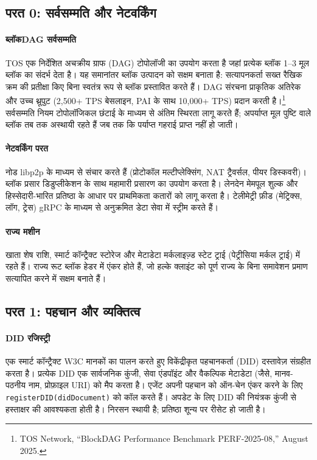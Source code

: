 \documentclass[11pt]{article}
\begin{document}
\subsection{परत 0: सर्वसम्मति और नेटवर्किंग}
\paragraph{ब्लॉकDAG सर्वसम्मति} TOS एक निर्देशित अचक्रीय ग्राफ (DAG) टोपोलॉजी का उपयोग करता है जहां प्रत्येक ब्लॉक 1--3 मूल ब्लॉक का संदर्भ देता है। यह समानांतर ब्लॉक उत्पादन को सक्षम बनाता है: सत्यापनकर्ता सख्त रैखिक क्रम की प्रतीक्षा किए बिना स्वतंत्र रूप से ब्लॉक प्रस्तावित करते हैं। DAG संरचना प्राकृतिक अतिरेक और उच्च थ्रूपुट (2,500+ TPS बेसलाइन, PAI के साथ 10,000+ TPS) प्रदान करती है।\footnote{TOS Network, ``BlockDAG Performance Benchmark PERF-2025-08,'' August 2025.} सर्वसम्मति नियम टोपोलॉजिकल छंटाई के माध्यम से अंतिम स्थिरता लागू करते हैं; अपर्याप्त मूल पुष्टि वाले ब्लॉक तब तक अस्थायी रहते हैं जब तक कि पर्याप्त गहराई प्राप्त नहीं हो जाती।

\paragraph{नेटवर्किंग परत} नोड libp2p के माध्यम से संचार करते हैं (प्रोटोकॉल मल्टीप्लेक्सिंग, NAT ट्रैवर्सल, पीयर डिस्कवरी)। ब्लॉक प्रसार डिडुप्लीकेशन के साथ महामारी प्रसारण का उपयोग करता है। लेनदेन मेमपूल शुल्क और हिस्सेदारी-भारित प्रतिष्ठा के आधार पर प्राथमिकता कतारों को लागू करता है। टेलीमेट्री फ़ीड (मेट्रिक्स, लॉग, ट्रेस) gRPC के माध्यम से अनुक्रमित डेटा सेवा में स्ट्रीम करते हैं।

\paragraph{राज्य मशीन} खाता शेष राशि, स्मार्ट कॉन्ट्रैक्ट स्टोरेज और मेटाडेटा मर्कलाइज़्ड स्टेट ट्राई (पेट्रीसिया मर्कल ट्राई) में रहते हैं। राज्य रूट ब्लॉक हेडर में एंकर होते हैं, जो हल्के क्लाइंट को पूर्ण राज्य के बिना समावेशन प्रमाण सत्यापित करने में सक्षम बनाते हैं।

\subsection{परत 1: पहचान और व्यक्तित्व}
\paragraph{DID रजिस्ट्री} एक स्मार्ट कॉन्ट्रैक्ट W3C मानकों का पालन करते हुए विकेंद्रीकृत पहचानकर्ता (DID) दस्तावेज़ संग्रहीत करता है। प्रत्येक DID एक सार्वजनिक कुंजी, सेवा एंडपॉइंट और वैकल्पिक मेटाडेटा (जैसे, मानव-पठनीय नाम, प्रोफ़ाइल URI) को मैप करता है। एजेंट अपनी पहचान को ऑन-चेन एंकर करने के लिए \texttt{registerDID(didDocument)} को कॉल करते हैं। अपडेट के लिए DID की नियंत्रक कुंजी से हस्ताक्षर की आवश्यकता होती है। निरसन स्थायी है; प्रतिष्ठा शून्य पर रीसेट हो जाती है।
\end{document}
